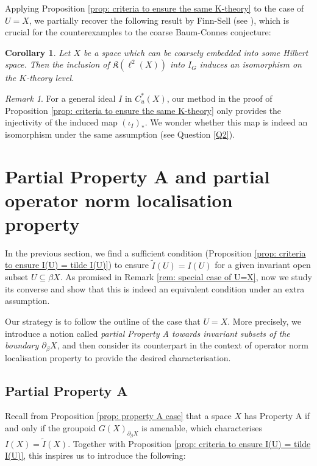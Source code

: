 \documentclass[12pt, a4paper]{amsart}
\numberwithin{equation}{section}
\newtheorem{cor}[thm]{Corollary}
\theoremstyle{definition}
\theoremstyle{remark}
\newtheorem{rem}[thm]{Remark}
\def\K{\mathfrak{K}}
\begin{document}
Applying Proposition \ref{prop: criteria to ensure the same K-theory} to the case of $U=X$, we partially recover the following result by Finn-Sell (see \cite[Proposition 35]{Fin14}), which is crucial for the  counterexamples to the coarse Baum-Connes conjecture:
\begin{cor}\label{cor: FS's result}
Let $X$ be a space which can be coarsely embedded into some Hilbert space. Then the inclusion of $\K(\ell^2(X))$ into $I_G$ induces an isomorphism on the $K$-theory level.
\end{cor}

\begin{rem}
For a general ideal $I$ in $C^*_u(X)$, our method in the proof of Proposition \ref{prop: criteria to ensure the same K-theory} only provides the injectivity of the induced map $(\iota_I)_\ast$. We wonder whether this map is indeed an isomorphism under the same assumption (see Question \ref{Q2}).
\end{rem}







\section{Partial Property A and partial operator norm localisation property}\label{sec:partial A and partial ONL}

In the previous section, we find a sufficient condition (Proposition \ref{prop: criteria to ensure I(U) = tilde I(U)}) to ensure $\tilde{I}(U) = I(U)$ for a given invariant open subset $U \subseteq \beta X$. As promised in Remark \ref{rem: special case of U=X}, now we study its converse and show that this is indeed an equivalent condition under an extra assumption.

Our strategy is to follow the outline of the case that $U=X$. More precisely, we introduce a notion called \emph{partial Property A towards invariant subsets of the boundary $\partial_\beta X$}, and then consider its counterpart in the context of operator norm localisation property to provide the desired characterisation.


\subsection{Partial Property A}\label{ssec:partial property A}

Recall from Proposition \ref{prop: property A case} that a space $X$ has Property A if and only if the groupoid $G(X)_{\partial_\beta X}$ is amenable, which characterises $I(X) = \tilde{I}(X)$. Together with Proposition \ref{prop: criteria to ensure I(U) = tilde I(U)}, this inspires us to introduce the following:
\end{document}
